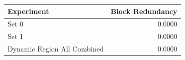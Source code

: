 \begin{tabular}{lr}
\toprule
Experiment & Block Redundancy \\
\midrule
Set 0 & 0.0000 \\
Set 1 & 0.0000 \\
Dynamic Region All Combined & 0.0000 \\
\bottomrule
\end{tabular}

